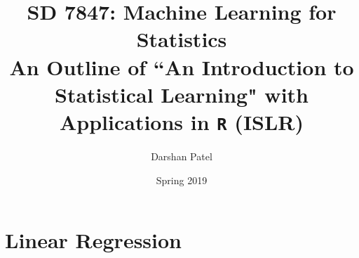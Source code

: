 \documentclass[12pt]{article}
\begin{document}
\theoremstyle{definition}
\newtheorem{theorem}{Theorem}[section]
\newtheorem{definition}{Definition}[section]
\newtheorem{example}{Example}[section]

\title{SD 7847: Machine Learning for Statistics \\ An Outline of ``An Introduction to Statistical Learning" with Applications in \texttt{R} (ISLR)}
\author{Darshan Patel}
\date{Spring 2019}
\maketitle

\tableofcontents 

\section{Linear Regression}
\end{document}
